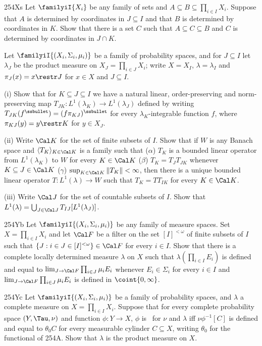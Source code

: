 {\spheader 254Xs Let $\familyiI{X_i}$ be any family of sets and
$A\subseteq B\subseteq\prod_{i\in I}X_i$.   Suppose that $A$ is
determined by coordinates in $J\subseteq I$ and that $B$ is determined
by coordinates in $K$.   Show that there is a set $C$ such that
$A\subseteq C\subseteq B$ and $C$ is determined by coordinates in
$J\cap K$.

Let $\familyiI{(X_i,\Sigma_i,\mu_i)}$ be a family of
probability spaces, and for $J\subseteq I$ let $\lambda_J$ be the
product
measure on $X_J=\prod_{i\in J}X_i$;  write $X=X_I$, $\lambda=\lambda_I$
and $\pi_J(x)=x\restr J$ for $x\in X$ and $J\subseteq I$.

\quad (i) Show that for $K\subseteq J\subseteq I$ we have a natural
linear, order-preserving and
norm-preserving map $T_{JK}:L^1(\lambda_K)\to L^1(\lambda_J)$ defined by
writing $T_{JK}(f^{\ssbullet})=(f\pi_{KJ})^{\ssbullet}$ for every
$\lambda_K$-integrable function $f$, where $\pi_{KJ}(y)=y\restr K$ for
$y\in X_J$.

\quad (ii) Write $\Cal K$ for the set of finite subsets of $I$.   Show
that if  $W$ is any Banach space and $\langle T_K\rangle_{K\in\Cal K}$
is a family such that ($\alpha$) $T_K$ is a bounded linear operator from
$L^1(\lambda_K)$ to $W$ for every $K\in\Cal K$ ($\beta$)
$T_K=T_JT_{JK}$ whenever $K\subseteq J\in \Cal K$ ($\gamma$)
$\sup_{K\in\Cal K}\|T_K\|<\infty$, then there is a unique bounded
linear operator $T:L^1(\lambda)\to W$ such that $T_K=TT_{IK}$ for every
$K\in\Cal K$.

\quad (iii) Write $\Cal J$ for the set of countable subsets of $I$.
Show that $L^1(\lambda)=\bigcup_{J\in\Cal J}T_{IJ}[L^1(\lambda_J)]$.

\spheader 254Yb Let $\familyiI{(X_i,\Sigma_i,\mu_i)}$
be any family of measure spaces.
Set $X=\prod_{i\in I}X_i$ and let $\Cal F$ be a filter on the
set $[I]^{<\omega}$ of finite subsets of $I$ such that
$\{J:i\in J\in[I]^{<\omega}\}\in\Cal F$ for every $i\in I$.   Show that
there is a complete locally determined
measure $\lambda$ on $X$ such that $\lambda(\prod_{i\in I}E_i)$
is defined and equal to $\lim_{J\to\Cal F}\prod_{i\in J}\mu_iE_i$ whenever
$E_i\in\Sigma_i$ for every $i\in I$ and
$\lim_{J\to\Cal F}\prod_{i\in J}\mu_iE_i$ is defined in
$\coint{0,\infty}$.

\spheader 254Yc
Let $\familyiI{(X_i,\Sigma_i,\mu_i)}$ be a family of probability
spaces, and $\lambda$ a complete measure on $X=\prod_{i\in I}X_i$.
Suppose that for every complete probability space $(Y,\Tau,\nu)$ and
function
$\phi:Y\to X$, $\phi$ is \imp\ for $\nu$ and $\lambda$ iff
$\nu\phi^{-1}[C]$ is defined and
equal to $\theta_0 C$ for every measurable cylinder $C\subseteq X$,
writing $\theta_0$ for the functional of 254A.    Show that
$\lambda$ is the product measure on $X$.

}
